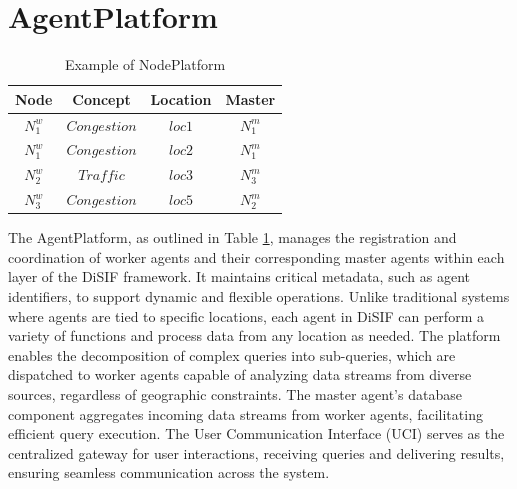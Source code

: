 \documentclass[5p,times]{elsarticle}
\begin{document}
\section*{AgentPlatform}



\begin{table}[t]

  \captionsetup{justification=raggedright, singlelinecheck=false} %
  \caption{\newline Example of NodePlatform}
  \vspace{-1em} %


  \begin{tabular}{cccc}
  \hline
  \textbf{Node} & \textbf{Concept} & \textbf{Location} & \textbf{Master} \\
  \hline
  $N^w_1$ & $Congestion$ & $loc1$ & $N^m_1$ \\
  $N^w_1$ & $Congestion$ & $loc2$ & $N^m_1$ \\
  $N^w_2$ & $Traffic$    & $loc3$ & $N^m_3$ \\
  $N^w_3$ & $Congestion$ & $loc5$ & $N^m_2$ \\
  \hline
  \end{tabular}
  \label{tab:NodePlatformTbl}
  \end{table}




  The AgentPlatform, as outlined in Table \ref{tab:NodePlatformTbl},
   manages the registration and coordination of worker agents and their 
   corresponding master agents within each layer of the DiSIF framework.
    It maintains critical metadata, such as agent identifiers, to support 
    dynamic and flexible operations. Unlike traditional systems where agents
     are tied to specific locations, each agent in DiSIF can perform a variety
      of functions and process data from any location as needed. The platform enables
       the decomposition of complex queries into sub-queries, which are dispatched to
        worker agents capable of analyzing data streams from diverse sources,
         regardless of geographic constraints. The master agent's database component
          aggregates incoming data streams from worker agents, facilitating
           efficient query execution. The User Communication Interface (UCI) serves
            as the centralized gateway for user interactions, receiving 
            queries and delivering results, ensuring seamless communication across the system.
\end{document}
